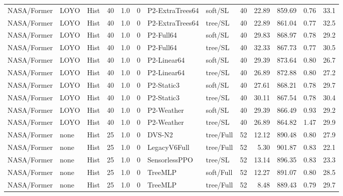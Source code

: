 \documentclass[10pt,a4paper]{article}
\begin{document}
\begin{landscape}
\begin{longtable}{llllllllrrrrr}
NASA/Former & LOYO & Hist & 40 & 1.0 & 0 & P2-ExtraTrees64 & soft/SL & 40 & 22.89 & 859.69 & 0.76 & 33.1 \\

NASA/Former & LOYO & Hist & 40 & 1.0 & 0 & P2-ExtraTrees64 & tree/SL & 40 & 22.89 & 861.04 & 0.77 & 32.5 \\

NASA/Former & LOYO & Hist & 40 & 1.0 & 0 & P2-Full64 & soft/SL & 40 & 29.83 & 868.97 & 0.78 & 29.2 \\

NASA/Former & LOYO & Hist & 40 & 1.0 & 0 & P2-Full64 & tree/SL & 40 & 32.33 & 867.73 & 0.77 & 30.5 \\

NASA/Former & LOYO & Hist & 40 & 1.0 & 0 & P2-Linear64 & soft/SL & 40 & 29.39 & 873.64 & 0.80 & 26.7 \\

NASA/Former & LOYO & Hist & 40 & 1.0 & 0 & P2-Linear64 & tree/SL & 40 & 26.89 & 872.88 & 0.80 & 27.2 \\

NASA/Former & LOYO & Hist & 40 & 1.0 & 0 & P2-Static3 & soft/SL & 40 & 27.61 & 868.21 & 0.78 & 29.7 \\

NASA/Former & LOYO & Hist & 40 & 1.0 & 0 & P2-Static3 & tree/SL & 40 & 30.11 & 867.54 & 0.78 & 30.4 \\

NASA/Former & LOYO & Hist & 40 & 1.0 & 0 & P2-Weather & soft/SL & 40 & 29.39 & 866.49 & 0.93 & 29.2 \\

NASA/Former & LOYO & Hist & 40 & 1.0 & 0 & P2-Weather & tree/SL & 40 & 26.89 & 864.82 & 1.47 & 29.9 \\

NASA/Former & none & Hist & 25 & 1.0 & 0 & DVS-N2 & tree/Full & 52 & 12.12 & 890.48 & 0.80 & 27.9 \\

NASA/Former & none & Hist & 25 & 1.0 & 0 & LegacyV6Full & tree/Full & 52 & 5.30 & 901.87 & 0.83 & 22.1 \\

NASA/Former & none & Hist & 25 & 1.0 & 0 & SensorlessPPO & tree/SL & 52 & 13.14 & 896.35 & 0.83 & 23.3 \\

NASA/Former & none & Hist & 25 & 1.0 & 0 & TreeMLP & soft/Full & 52 & 12.27 & 891.07 & 0.80 & 28.5 \\

NASA/Former & none & Hist & 25 & 1.0 & 0 & TreeMLP & tree/Full & 52 & 8.48 & 889.43 & 0.79 & 29.7 \\


\end{longtable}
\end{landscape}
\end{document}
